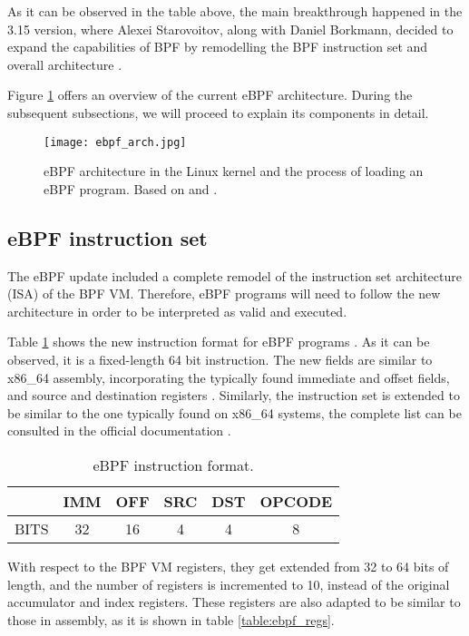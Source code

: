 As it can be observed in the table above, the main breakthrough happened in the 3.15 version, where Alexei Starovoitov, along with Daniel Borkmann, decided to expand the capabilities of BPF by remodelling the BPF instruction set and overall architecture \cite{brendan_gregg_bpf_book}.

Figure \ref{fig:ebpf_architecture} offers an overview of the current eBPF architecture. During the subsequent subsections, we will proceed to explain its components in detail.

\begin{figure}[htbp]
	\centering
	\texttt{[image: ebpf\_arch.jpg]}
	\caption{eBPF architecture in the Linux kernel and the process of loading an eBPF program. Based on \cite{brendan_gregg_bpf_book} and \cite{ebpf_io_arch}.}
	\label{fig:ebpf_architecture}
\end{figure}

\subsection{eBPF instruction set} \label{subsection:ebpf_inst_set}
The eBPF update included a complete remodel of the instruction set architecture (ISA) of the BPF VM. Therefore, eBPF programs will need to follow the new architecture in order to be interpreted as valid and executed.

Table \ref{table:ebpf_inst_format} shows the new instruction format for eBPF programs \cite{ebpf_inst_set}. As it can be observed, it is a fixed-length 64 bit instruction. The new fields are similar to x86\_64 assembly, incorporating the typically found immediate and offset fields, and source and destination registers \cite{8664_inst_set_specs}. Similarly, the instruction set is extended to be similar to the one typically found on x86\_64 systems, the complete list can be consulted in the official documentation \cite{ebpf_inst_set}.

\begin{table}[htbp]
\begin{tabular}{|c|c|c|c|c|c|}
\hline
& IMM & OFF & SRC & DST & OPCODE \\
\hline
BITS & 32 & 16 & 4 & 4 & 8\\
\hline
\end{tabular}
\caption{eBPF instruction format.}
\label{table:ebpf_inst_format}
\end{table}

With respect to the BPF VM registers, they get extended from 32 to 64 bits of length, and the number of registers is incremented to 10, instead of the original accumulator and index registers. These registers are also adapted to be similar to those in assembly, as it is shown in table \ref{table:ebpf_regs}.

